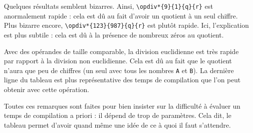 \documentclass[12pt]{report}
\begin{document}
Quelques résultats semblent bizarres. Ainsi,
\verb+\opdiv*{9}{1}{q}{r}+ est anormalement rapide : cela est dû
au fait d'avoir un quotient à un seul chiffre. Plus bizarre encore,
\verb+\opdiv*{123}{987}{q}{r}+ est plutôt rapide. Ici,
l'explication est plus subtile : cela est dû à la présence de nombreux
zéros au quotient.

Avec des opérandes de taille comparable, la division euclidienne est
très rapide par rapport à la division non euclidienne. Cela est dû au
fait que le quotient n'aura que peu de chiffres (un seul avec tous les
nombres \texttt{A} et \texttt{B}). La dernière ligne du tableau est
plus représentative des temps de compilation que l'on peut obtenir
avec cette opération.

Toutes ces remarques sont faites pour bien insister sur la difficulté
à évaluer un temps de compilation a priori : il dépend de trop de
paramètres. Cela dit, le tableau permet d'avoir quand même une idée de
ce à quoi il faut s'attendre.

\clearpage
\end{document}
